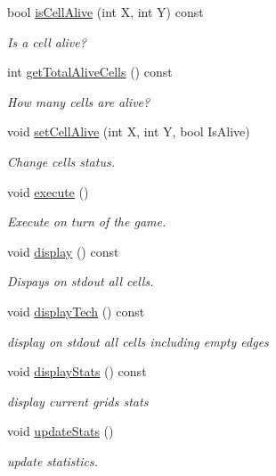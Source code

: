 \begin{DoxyCompactItemize}
bool \hyperlink{class_l_g_grid_a3f80bb0ef067ba5ca56dc46559546210}{is\+Cell\+Alive} (int X, int Y) const 
\begin{DoxyCompactList}\small\item\em Is a cell alive? \end{DoxyCompactList}\item 
int \hyperlink{class_l_g_grid_ad89b8fe1a3bbf109deb0ccb1964de85a}{get\+Total\+Alive\+Cells} () const 
\begin{DoxyCompactList}\small\item\em How many cells are alive? \end{DoxyCompactList}\item 
void \hyperlink{class_l_g_grid_a37f267a351299074d9d1d03ea28a2d98}{set\+Cell\+Alive} (int X, int Y, bool Is\+Alive)
\begin{DoxyCompactList}\small\item\em Change cell\textquotesingle{}s status. \end{DoxyCompactList}\item 
void \hyperlink{class_l_g_grid_ad161c500c152ca9288d2ba4a230d3da7}{execute} ()\hypertarget{class_l_g_grid_ad161c500c152ca9288d2ba4a230d3da7}{}\label{class_l_g_grid_ad161c500c152ca9288d2ba4a230d3da7}

\begin{DoxyCompactList}\small\item\em Execute on turn of the game. \end{DoxyCompactList}\item 
void \hyperlink{class_l_g_grid_a804d76972bad129df26db583525279ca}{display} () const \hypertarget{class_l_g_grid_a804d76972bad129df26db583525279ca}{}\label{class_l_g_grid_a804d76972bad129df26db583525279ca}

\begin{DoxyCompactList}\small\item\em Dispays on stdout all cells. \end{DoxyCompactList}\item 
void \hyperlink{class_l_g_grid_a13a56fcc4a925652b5f1bb801ff22d52}{display\+Tech} () const \hypertarget{class_l_g_grid_a13a56fcc4a925652b5f1bb801ff22d52}{}\label{class_l_g_grid_a13a56fcc4a925652b5f1bb801ff22d52}

\begin{DoxyCompactList}\small\item\em display on stdout all cells including empty edges \end{DoxyCompactList}\item 
void \hyperlink{class_l_g_grid_afb90f52b6f28dc776455042724565041}{display\+Stats} () const 
\begin{DoxyCompactList}\small\item\em display current grid\textquotesingle{}s stats \end{DoxyCompactList}\item 
void \hyperlink{class_l_g_grid_a32c0809f6ff084d0eb3332f73aa7d20e}{update\+Stats} ()
\begin{DoxyCompactList}\small\item\em update statistics. \end{DoxyCompactList}\end{DoxyCompactItemize}



